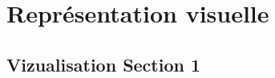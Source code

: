 %
\chapter{Représentation visuelle}
\label{ch:visual_representation}


\Blindtext[2][1]

\section{Vizualisation Section 1}
\label{sec:visual_representation:sec1}
